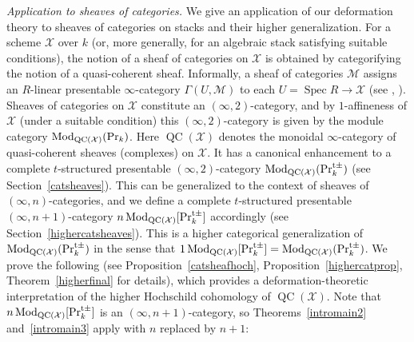 \documentclass[leqno,12pt]{amsart}
\theoremstyle{plain}
\theoremstyle{definition}
\newcommand{\PR}{\textup{Pr}}
\newcommand{\PRTTT}{\textup{Pr}^{\textup{t}\pm}}
\newcommand{\MMM}{\mathcal{M}}
\newcommand{\Spec}{\operatorname{Spec}}
\newcommand{\Mod}{\operatorname{Mod}}
\newcommand{\QC}{\operatorname{QC}}
\newcommand{\XX}{\mathcal{X}}
\begin{document}
\vspace{2mm}


{\it Application to sheaves of categories.}
We give an application of our deformation theory to sheaves of categories on stacks and their higher generalization.
For a scheme $\XX$ over $k$ (or, more generally, for an algebraic stack satisfying suitable conditions),
the notion of a sheaf of categories on $\XX$ is obtained by categorifying the notion of a quasi-coherent sheaf. Informally, a sheaf of categories $\MMM$ assigns an $R$-linear presentable $\infty$-category $\Gamma(U,\MMM)$
to each $U=\Spec R\to \XX$ (see \cite{Gai1aff}, \cite{TV}). Sheaves of categories on $\XX$ constitute an $(\infty,2)$-category, and by
$1$-affineness of $\XX$ \cite{Gai1aff} (under a suitable condition) this $(\infty,2)$-category is given by the module category $\Mod_{\QC(\XX)}(\PR_k)$. 
Here $\QC(\XX)$ denotes the monoidal $\infty$-category of quasi-coherent sheaves (complexes) on $\XX$. It has a canonical enhancement to a complete $t$-structured presentable $(\infty,2)$-category
$\Mod_{\QC(\XX)}(\PRTTT_k)$ (see Section~\ref{catsheaves}). This can be generalized to the context of sheaves of $(\infty,n)$-categories, and we define
a complete $t$-structured presentable $(\infty,n+1)$-category $n\Mod_{\QC(\mathcal{X})}[\PRTTT_k]$ accordingly (see Section~\ref{highercatsheaves}).
This is a higher categorical generalization of $\Mod_{\QC(\XX)}(\PRTTT_k)$ in the sense that $1\Mod_{\QC(\mathcal{X})}[\PRTTT_k]=\Mod_{\QC(\XX)}(\PRTTT_k)$.
We prove the following (see Proposition~\ref{catsheafhoch}, Proposition~\ref{highercatprop}, Theorem~\ref{higherfinal} for details),
which provides a deformation-theoretic interpretation of the higher Hochschild cohomology of $\QC(\XX)$.
Note that $n\Mod_{\QC(\mathcal{X})}[\PRTTT_k]$ is an $(\infty,n+1)$-category, so Theorems~\ref{intromain2} and~\ref{intromain3} apply with $n$ replaced by $n+1$:
\end{document}
